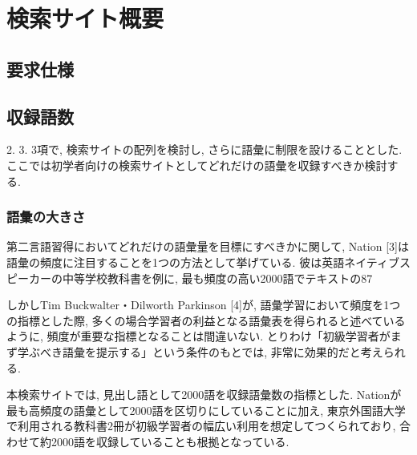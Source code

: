 \documentclass[technicalreport]{ieicej}
\begin{document}
\section{検索サイト概要}
\subsection{要求仕様}
\subsection{収録語数}
2. 3. 3項で, 検索サイトの配列を検討し, さらに語彙に制限を設けることとした. ここでは初学者向けの検索サイトとしてどれだけの語彙を収録すべきか検討する.

\subsubsection{語彙の大きさ}
第二言語習得においてどれだけの語彙量を目標にすべきかに関して, Nation [3]は語彙の頻度に注目することを1つの方法として挙げている. 彼は英語ネイティブスピーカーの中等学校教科書を例に, 最も頻度の高い2000語でテキストの87%

しかしTim Buckwalter・Dilworth Parkinson [4]が, 語彙学習において頻度を1つの指標とした際, 多くの場合学習者の利益となる語彙表を得られると述べているように, 頻度が重要な指標となることは間違いない. とりわけ「初級学習者がまず学ぶべき語彙を提示する」という条件のもとでは, 非常に効果的だと考えられる.

本検索サイトでは, 見出し語として2000語を収録語彙数の指標とした. Nationが最も高頻度の語彙として2000語を区切りにしていることに加え, 東京外国語大学で利用される教科書2冊が初級学習者の幅広い利用を想定してつくられており, 合わせて約2000語を収録していることも根拠となっている.
\end{document}
